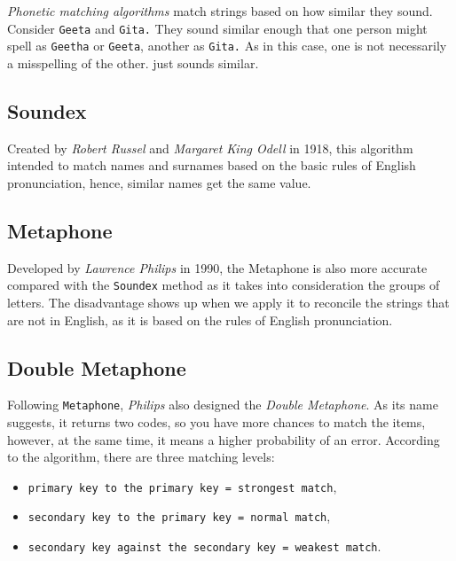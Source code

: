 \documentclass[
]{book}
\providecommand{\tightlist}{%
  \setlength{\itemsep}{0pt}\setlength{\parskip}{0pt}}
\begin{document}
\emph{Phonetic matching algorithms} match strings based on how similar they sound. Consider \texttt{Geeta} and \texttt{Gita.} They sound similar enough that one person might spell as \texttt{Geetha} or \texttt{Geeta}, another as \texttt{Gita.} As in this case, one is not necessarily a misspelling of the other. just sounds similar.

\hypertarget{soundex}{%
\subsection{Soundex}\label{soundex}}

Created by \emph{Robert Russel} and \emph{Margaret King Odell} in 1918, this algorithm intended to match names and surnames based on the basic rules of English pronunciation, hence, similar names get the same value.

\hypertarget{metaphone}{%
\subsection{Metaphone}\label{metaphone}}

Developed by \emph{Lawrence Philips} in 1990, the Metaphone is also more accurate compared with the \texttt{Soundex} method as it takes into consideration the groups of letters. The disadvantage shows up when we apply it to reconcile the strings that are not in English, as it is based on the rules of English pronunciation.

\hypertarget{double-metaphone}{%
\subsection{Double Metaphone}\label{double-metaphone}}

Following \texttt{Metaphone}, \emph{Philips} also designed the \emph{Double Metaphone}. As its name suggests, it returns two codes, so you have more chances to match the items, however, at the same time, it means a higher probability of an error. According to the algorithm, there are three matching levels:

\begin{itemize}
\tightlist
\item
  \texttt{primary\ key\ to\ the\ primary\ key\ =\ strongest\ match},
\item
  \texttt{secondary\ key\ to\ the\ primary\ key\ =\ normal\ match},
\item
  \texttt{secondary\ key\ against\ the\ secondary\ key\ =\ weakest\ match}.
\end{itemize}
\end{document}
